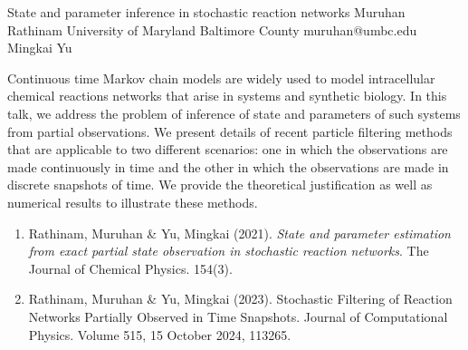 \begin{talk}
  {State and parameter inference in stochastic reaction networks}%
  {Muruhan Rathinam}%
  {University of Maryland Baltimore County}%
  {muruhan@umbc.edu}%
  {Mingkai Yu}%
  
    
Continuous time Markov chain models are widely used to model intracellular chemical reactions networks that arise in systems and synthetic biology. In this talk, we address the problem of inference of state and parameters of such systems from partial observations. We present details of recent particle filtering methods that are applicable to two different scenarios: one in which the observations are made continuously in time and the other in which the observations are made in discrete snapshots of time.            We provide the theoretical justification as well as numerical results to illustrate these methods.       
   
\medskip

\begin{enumerate}
 \item[{[1]}] Rathinam, Muruhan \& Yu, Mingkai (2021). {\it State and parameter estimation from exact partial state observation in stochastic reaction networks}. The Journal of Chemical Physics. 
 154(3).
 \item[{[2]}] Rathinam, Muruhan \& Yu, Mingkai (2023). Stochastic Filtering of Reaction Networks Partially Observed in Time Snapshots. Journal of Computational Physics. 
Volume 515, 15 October 2024, 113265. 

\end{enumerate}

\end{talk}
